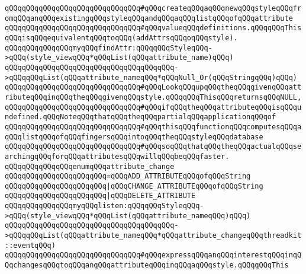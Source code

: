 \verb|qQQqqQQqqQQqqQQqqQQqqQQqqQQqqQQq#qQQqcreateqQQqaqQQqnewqQQqstyleqQQqfromqQQqanqQQqexistingqQQqstyleqQQqandqQQqaqQQqlistqQQqofqQQqattribute|\newline
\verb|qQQqqQQqqQQqqQQqqQQqqQQqqQQqqQQq#qQQqvalueqQQqdefinitions.qQQqqQQqThisqQQqisqQQqequivalentqQQqtoqQQq(addAttrsqQQqoqQQqstyle).|\newline
\newline
\newline
\verb|qQQqqQQqqQQqqQQqmyqQQqfindAttr:qQQqqQQqStyleqQQq->qQQq(style_viewqQQq*qQQqList(qQQqattribute_name)qQQq)|\newline
\verb|qQQqqQQqqQQqqQQqqQQqqQQqqQQqqQQqqQQqqQQq->qQQqqQQqList(qQQqattribute_nameqQQq*qQQqNull_Or(qQQqStringqQQq)qQQq)|\newline
\verb|qQQqqQQqqQQqqQQqqQQqqQQqqQQqqQQq#qQQqLookqQQqupqQQqtheqQQqgivenqQQqattributeqQQqinqQQqtheqQQqgivenqQQqstyle.qQQqqQQqThisqQQqreturnsqQQqNULL,|\newline
\verb|qQQqqQQqqQQqqQQqqQQqqQQqqQQqqQQq#qQQqifqQQqtheqQQqattributeqQQqisqQQqundefined.qQQqNoteqQQqthatqQQqtheqQQqpartialqQQqapplicationqQQqof|\newline
\verb|qQQqqQQqqQQqqQQqqQQqqQQqqQQqqQQq#qQQqthisqQQqfunctionqQQqcomputesqQQqaqQQqlistqQQqofqQQqfingersqQQqintoqQQqtheqQQqstyleqQQqdatabase|\newline
\verb|qQQqqQQqqQQqqQQqqQQqqQQqqQQqqQQq#qQQqsoqQQqthatqQQqtheqQQqactualqQQqsearchingqQQqforqQQqattributesqQQqwillqQQqbeqQQqfaster.|\newline
\newline
\newline
\verb|qQQqqQQqqQQqqQQqenumqQQqattribute_change|\newline
\verb|qQQqqQQqqQQqqQQqqQQqqQQq=qQQqADD_ATTRIBUTEqQQqofqQQqString|\newline
\verb|qQQqqQQqqQQqqQQqqQQqqQQq|\verb#|qQQqCHANGE_ATTRIBUTEqQQqofqQQqString#\newline
\verb|qQQqqQQqqQQqqQQqqQQqqQQq|\verb#|qQQqDELETE_ATTRIBUTE#\newline
\newline
\verb|qQQqqQQqqQQqqQQqmyqQQqlisten:qQQqqQQqStyleqQQq->qQQq(style_viewqQQq*qQQqList(qQQqattribute_nameqQQq)qQQq)|\newline
\verb|qQQqqQQqqQQqqQQqqQQqqQQqqQQqqQQqqQQqqQQq->qQQqqQQqList(qQQqattribute_nameqQQq*qQQqattribute_changeqQQqthreadkit::eventqQQq)|\newline
\verb|qQQqqQQqqQQqqQQqqQQqqQQqqQQqqQQq#qQQqexpressqQQqanqQQqinterestqQQqinqQQqchangesqQQqtoqQQqanqQQqattributeqQQqinqQQqaqQQqstyle.qQQqqQQqThis|\newline
